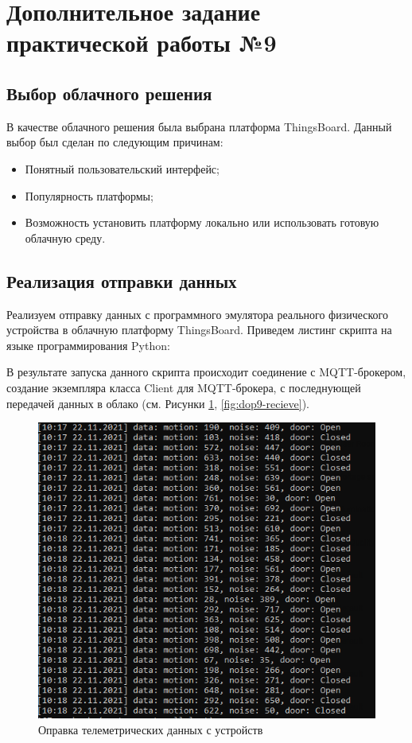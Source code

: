 \documentclass[utf8x]{G7-32} %
\newcommand{\pathToScriptsFolder}{/home/denilai/Documents/repos/latex/scripts}
\begin{document}
\newpage

\section{Дополнительное задание практической работы №9}
\subsection{Выбор облачного решения}

В качестве облачного решения была выбрана платформа ThingsBoard. Данный выбор был сделан по следующим причинам:
\begin{itemize}
	\item Понятный пользовательский интерфейс;
	\item Популярность платформы;
	\item Возможность установить платформу локально или использовать готовую облачную среду.
\end{itemize}


\subsection{Реализация отправки данных}

Реализуем отправку данных с программного эмулятора реального физического устройства в облачную платформу ThingsBoard. Приведем листинг скрипта на языке программирования Python:



В результате запуска данного скрипта происходит соединение с MQTT-брокером, создание экземпляра класса Client для MQTT-брокера, с последнующей передачей данных в облако (см. Рисунки \ref{fig:dop9-send},  \ref{fig:dop9-recieve}).


\begin{figure}[h!]
	\centering
	\includegraphics[width=0.6\linewidth]{images/dop9-send}
	\caption{Оправка телеметрических данных с устройств }
	\label{fig:dop9-send}
\end{figure}
\end{document}
